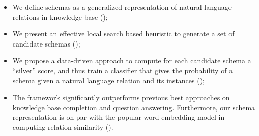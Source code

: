 \begin{itemize}
\itemsep0em
\item We define schemas as a generalized representation of natural language
relations in knowledge base ();
\item %
We present an effective local search based heuristic to generate a set of
candidate schemas ();
\item We propose a data-driven approach to compute for each candidate
schema a ``silver'' score, and thus train a classifier that gives
the probability of a schema given a natural language relation and its
instances ();
\item The framework significantly outperforms 
previous best approaches on knowledge base completion 
and question answering. Furthermore, our schema representation is
on par with the popular word embedding model in computing relation similarity ().
\end{itemize}

